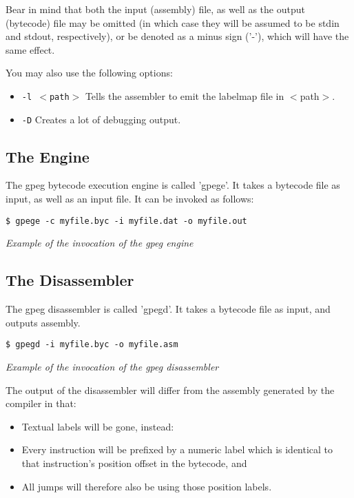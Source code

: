 Bear in mind that both the input (assembly) file, as well as the
output (bytecode) file may be omitted (in which case they will be
assumed to be stdin and stdout, respectively), or be denoted as
a minus sign ('-'), which will have the same effect.

You may also use the following options:

\begin{itemize}
\item \texttt{-l $<$path$>$} Tells the assembler to emit the labelmap
      file in $<$path$>$.
\item \texttt{-D} Creates a lot of debugging output.
\end{itemize}

\subsection{The Engine}

The gpeg bytecode execution engine is called 'gpege'.
It takes a bytecode file as input, as well as an input file.
It can be invoked as follows:

\begin{myquote}
\begin{verbatim}
$ gpege -c myfile.byc -i myfile.dat -o myfile.out
\end{verbatim}
\end{myquote}
\textit{Example of the invocation of the gpeg engine}

\subsection{The Disassembler}

The gpeg disassembler is called 'gpegd'.
It takes a bytecode file as input, and outputs assembly.

\begin{myquote}
\begin{verbatim}
$ gpegd -i myfile.byc -o myfile.asm
\end{verbatim}
\end{myquote}
\textit{Example of the invocation of the gpeg disassembler}

The output of the disassembler will differ from the assembly
generated by the compiler in that:

\begin{itemize}
\item Textual labels will be gone, instead:
\item Every instruction will be prefixed by a numeric label which
      is identical to that instruction's position offset in the bytecode, and
\item All jumps will therefore also be using those position labels.
\end{itemize}
